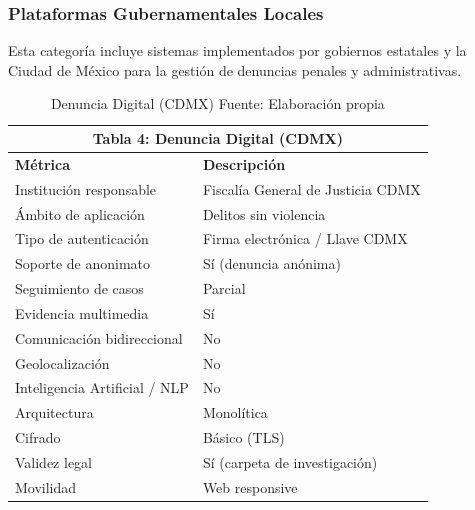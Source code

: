 
\subsubsection{Plataformas Gubernamentales Locales}

\begin{flushleft}
\justifying
Esta categoría incluye sistemas implementados por gobiernos estatales y la Ciudad de México para la gestión de denuncias penales y administrativas.
\end{flushleft}

\begin{table}[htbp]
\centering
\small
\begin{tabular}{|l|l|}
\hline \multicolumn{2}{|c|}{\textbf{Tabla 4: Denuncia Digital (CDMX)}} \\
\hline \textbf{Métrica} & \textbf{Descripción} \\
\hline Institución responsable & Fiscalía General de Justicia CDMX \\
\hline Ámbito de aplicación & Delitos sin violencia \\
\hline Tipo de autenticación & Firma electrónica / Llave CDMX \\
\hline Soporte de anonimato & Sí (denuncia anónima) \\
\hline Seguimiento de casos & Parcial \\
\hline Evidencia multimedia & Sí \\
\hline Comunicación bidireccional & No \\
\hline Geolocalización & No \\
\hline Inteligencia Artificial / NLP & No \\
\hline Arquitectura & Monolítica \\
\hline Cifrado & Básico (TLS) \\
\hline Validez legal & Sí (carpeta de investigación) \\
\hline Movilidad & Web responsive \\
\hline \end{tabular}
\caption{Denuncia Digital (CDMX) \footnotesize Fuente: Elaboración propia \cite{9,10} \label{tab:denunciadigital}}
\end{table}



